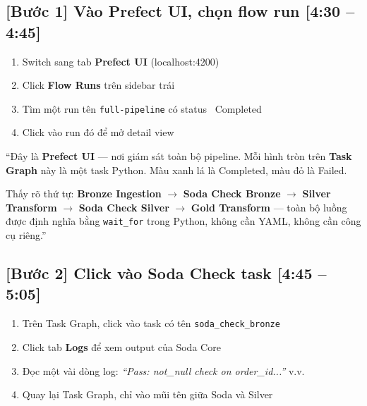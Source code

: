 \documentclass[12pt, a4paper]{article}
\newenvironment{speakerbox}[2]{%
  \begin{tcolorbox}[
    enhanced, breakable,
    colback=#1!6!white, colframe=#1,
    colbacktitle=#1, coltitle=white,
    fonttitle=\bfseries\large,
    title={#2},
    arc=4pt, boxrule=1.5pt,
    left=8pt, right=8pt, top=6pt, bottom=6pt,
  ]
}{\end{tcolorbox}}
\newcommand{\timing}[1]{\hfill{\small\bfseries\color{gray}[#1]}}
\newcommand{\code}[1]{\texttt{\small#1}}
\begin{document}
\begin{speakerbox}{p2color}{\faUser\ Người 2 \textbullet\ 4:30 -- 5:20 \textbullet\ DEMO Prefect UI}

\subsection*{[Bước 1] Vào Prefect UI, chọn flow run \timing{4:30 -- 4:45}}

\begin{demobox}
\begin{enumerate}[leftmargin=1.5em, itemsep=4pt]
  \item Switch sang tab \textbf{Prefect UI} (localhost:4200)
  \item Click \textbf{Flow Runs} trên sidebar trái
  \item Tìm một run tên \code{full-pipeline} có status \textcolor{green!60!black}{\faCheckCircle\ Completed}
  \item Click vào run đó để mở detail view
\end{enumerate}
\end{demobox}

\begin{scriptbox}
``Đây là \textbf{Prefect UI} --- nơi giám sát toàn bộ pipeline. Mỗi
hình tròn trên \textbf{Task Graph} này là một task Python. Màu xanh lá là
\textcolor{green!60!black}{Completed}, màu đỏ là Failed.

Thấy rõ thứ tự: \textbf{Bronze Ingestion} $\to$ \textbf{Soda Check Bronze}
$\to$ \textbf{Silver Transform} $\to$ \textbf{Soda Check Silver} $\to$
\textbf{Gold Transform} --- toàn bộ luồng được định nghĩa bằng
\code{wait\_for} trong Python, không cần YAML, không cần công cụ riêng.''
\end{scriptbox}

\subsection*{[Bước 2] Click vào Soda Check task \timing{4:45 -- 5:05}}

\begin{demobox}
\begin{enumerate}[leftmargin=1.5em, itemsep=4pt]
  \item Trên Task Graph, click vào task có tên \code{soda\_check\_bronze}
  \item Click tab \textbf{Logs} để xem output của Soda Core
  \item Đọc một vài dòng log: \textit{``Pass: not\_null check on order\_id...''} v.v.
  \item Quay lại Task Graph, chỉ vào mũi tên giữa Soda và Silver
\end{enumerate}
\end{demobox}


\end{speakerbox}
\end{document}
